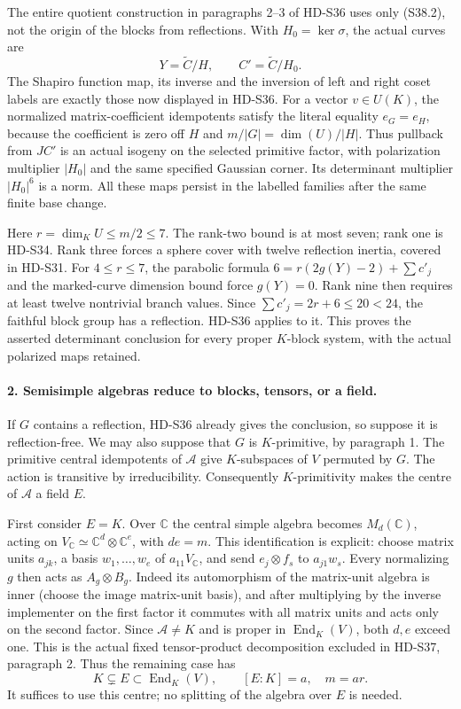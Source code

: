 The entire quotient construction in paragraphs 2--3 of HD-S36
uses only (S38.2), not the origin of the blocks from reflections.
With \(H_0=\ker\sigma\), the actual curves are
\[
     Y=\widetilde C/H,\qquad C'=\widetilde C/H_0.
                                                               \tag{S38.3}
\]
The Shapiro function map, its inverse and the inversion of left
and right coset labels are exactly those now displayed in HD-S36.
For a vector \(v\in U(K)\), the normalized matrix-coefficient
idempotents satisfy the literal equality \(e_G=e_H\), because
the coefficient is zero off \(H\) and
\(m/|G|=\dim(U)/|H|\).
Thus pullback from \(JC'\) is an actual isogeny on the selected
primitive factor, with polarization multiplier \(|H_0|\) and
the same specified Gaussian corner. Its determinant multiplier
\(|H_0|^6\) is a norm. All these maps persist in the labelled
families after the same finite base change.

Here \(r=\dim_KU\le m/2\le7\). The rank-two bound is at
most seven; rank one is HD-S34. Rank three forces a sphere cover
with twelve reflection inertia, covered in HD-S31. For
\(4\le r\le7\), the parabolic formula
\(6=r(2g(Y)-2)+\sum c'_j\) and the marked-curve dimension
bound force \(g(Y)=0\). Rank nine then requires at least
twelve nontrivial branch values. Since
\(\sum c'_j=2r+6\le20<24\), the faithful block group has a
reflection. HD-S36 applies to it. This proves the asserted
determinant conclusion for every proper \(K\)-block system,
with the actual polarized maps retained.

\paragraph{2. Semisimple algebras reduce to blocks, tensors, or a field.}
If \(G\) contains a reflection, HD-S36 already gives the
conclusion, so suppose it is reflection-free. We may also suppose
that \(G\) is \(K\)-primitive, by paragraph 1.
The primitive central idempotents of \(\mathcal A\) give
\(K\)-subspaces of \(V\) permuted by \(G\). The action is
transitive by irreducibility. Consequently \(K\)-primitivity
makes the centre of \(\mathcal A\) a field \(E\).

First consider \(E=K\). Over \(\mathbb C\) the central
simple algebra becomes \(M_d(\mathbb C)\), acting on
\(V_{\mathbb C}\simeq\mathbb C^d\otimes\mathbb C^e\),
with \(de=m\). This identification is explicit: choose matrix
units \(a_{jk}\), a basis \(w_1,\ldots,w_e\) of
\(a_{11}V_{\mathbb C}\), and send
\(e_j\otimes f_s\) to \(a_{j1}w_s\).
Every normalizing \(g\) then acts as \(A_g\otimes B_g\).
Indeed its automorphism of the matrix-unit algebra is inner
(choose the image matrix-unit basis), and after multiplying by
the inverse implementer on the first factor it commutes with all
matrix units and acts only on the second factor.
Since \(\mathcal A\ne K\) and is proper in
\(\operatorname{End}_K(V)\), both \(d,e\) exceed one.
This is the actual fixed tensor-product decomposition excluded
in HD-S37, paragraph 2. Thus the remaining case has
\[
              K\subsetneq E\subset\operatorname{End}_K(V),
              \qquad [E:K]=a,\quad m=ar.                   \tag{S38.4}
\]
It suffices to use this centre; no splitting of the algebra over
\(E\) is needed.

